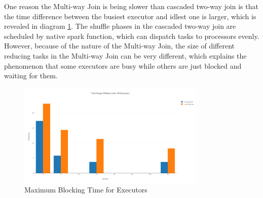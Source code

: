One reason the Multi-way Join is being slower than cascaded two-way join is that the time difference between the busiest executor and idlest one is larger, which is revealed in diagram  \ref{fig:Time-Range-Difference-For-All-Executors.png}. The shuffle phases in the cascaded two-way join are scheduled by native spark function, which can dispatch tasks to processors evenly. However, because of the nature of the Multi-way Join, the size of different reducing tasks in the Multi-way Join can be very different, which explains the phenomenon that some executors are busy while others are just blocked and waiting for them.
\begin{figure}[h!]
  \caption{Maximum Blocking Time for Executors}
  \label{fig:Time-Range-Difference-For-All-Executors.png}
  \centering
    \includegraphics[width=0.8\textwidth]{img/Time-Range-Difference-For-All-Executors}
\end{figure}

